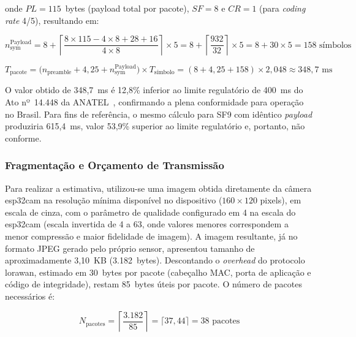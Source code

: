 \noindent onde $PL = 115$~bytes (\gls{payload} total por pacote), $SF = 8$ e $CR = 1$
(para \textit{coding rate} 4/5), resultando em:
 
\begin{equation}
  n_{\text{sym}}^{\text{Payload}} = 8 + \left\lceil \frac{8 \times 115 - 4 \times 8 + 28 + 16}{4 \times 8} \right\rceil \times 5
  = 8 + \left\lceil \frac{932}{32} \right\rceil \times 5
  = 8 + 30 \times 5 = 158 \text{ símbolos}
\end{equation}
 
\begin{equation}
  \label{eq:tpacote}
  T_{\text{pacote}} = \bigl(n_{\text{preamble}} + 4{,}25 + n_{\text{sym}}^{\text{Payload}}\bigr) \times T_{\text{símbolo}}
  = \left(8 + 4{,}25 + 158\right) \times 2{,}048 \approx 348{,}7 \text{ ms}
\end{equation}
 
O valor obtido de 348,7~ms é 12,8\% inferior ao limite regulatório de 400~ms
do Ato nº~14.448 da ANATEL~\cite{anatel2017}, confirmando a plena conformidade
para operação no Brasil. Para fins de referência, o mesmo cálculo para SF9 com
idêntico \textit{\gls{payload}} produziria 615,4~ms, valor 53,9\% superior ao limite
regulatório e, portanto, não conforme.
 
\subsubsection{Fragmentação e Orçamento de Transmissão}
 
Para realizar a estimativa, utilizou-se uma imagem obtida diretamente da câmera
\gls{esp32cam} na resolução mínima disponível no dispositivo ($160 \times 120$ pixels),
em escala de cinza, com o parâmetro de qualidade configurado em 4 na escala do
\gls{esp32cam} (escala invertida de 4 a 63, onde valores menores correspondem a menor
compressão e maior fidelidade de imagem). A imagem resultante, já no formato JPEG
gerado pelo próprio sensor, apresentou tamanho de aproximadamente 3,10~KB
(3.182~bytes). Descontando o \textit{overhead} do protocolo \gls{lorawan}, estimado em
30~bytes por pacote (cabeçalho MAC, porta de aplicação e código de integridade),
restam 85~bytes úteis por pacote. O número de pacotes necessários é:
 
\begin{equation}
  \label{eq:pacotes}
  N_{\text{pacotes}} = \left\lceil \frac{3{.}182}{85} \right\rceil = \lceil 37{,}44 \rceil = 38 \text{ pacotes}
\end{equation}
 
